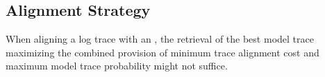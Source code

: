 
\subsection{Alignment Strategy}\label{subsec:as}
When aligning a log trace with an \uswn, the retrieval of the best model trace maximizing the combined provision of minimum trace alignment cost and maximum model trace probability might not suffice.
